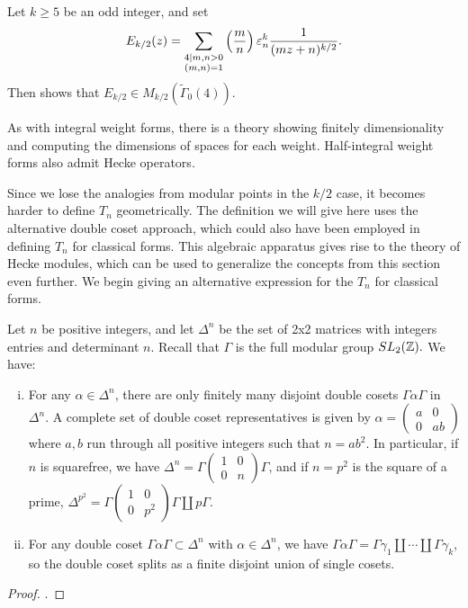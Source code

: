 \documentclass[12pt, a4paper]{report}
\begin{document}
\begin{example}
  Let $k \geq 5$ be an odd integer, and set
   \[E_{k/2}(z) = \sum_{\substack{4 \mid m,n > 0 \\ (m,n) = 1}} \left(\frac{m}{n}\right) 
    \varepsilon_n^k \frac{1}{(mz + n)^{k/2}}.\]
  Then \cite[Page 186]{koblitz} shows that $E_{k/2} \in M_{k/2}(\tilde{\Gamma}_0(4)).$
\end{example}

As with integral weight forms, there is a theory showing finitely dimensionality
and computing the dimensions of spaces for each weight. Half-integral weight
forms also admit Hecke operators.  

Since we lose the analogies from modular points in the $k/2$ case, it becomes
harder to define $T_n$ geometrically. The definition we will give here uses the
alternative double coset approach, which could also have been employed in
defining $T_n$ for classical forms. This algebraic apparatus gives
rise to the theory of Hecke modules, which can be used to generalize
the concepts from this section even further. We begin giving an alternative
expression for the $T_n$ for classical forms.

\begin{prop} \label{hecke_alt}
  Let $n$ be positive integers, and let $\Delta^n$ be the set of 2x2 matrices
  with integers entries and determinant $n$. Recall that $\Gamma$ is the full
  modular group $SL_2({\mathbb Z}).$ We have:
  \begin{enumerate}[(i)]
  \item For any $\alpha \in \Delta^n$, there are only finitely many disjoint
    double cosets $\Gamma \alpha \Gamma$ in $\Delta^n.$ A complete set of double
    coset representatives is given by $\alpha = \left(
      \begin{smallmatrix}
        a & 0 \\ 0 & a b
      \end{smallmatrix}
    \right)$  where $a, b$ run through all positive integers such that $n =
    a b^2.$
    In particular, if $n$ is squarefree, we have $\Delta^n = \Gamma \left(
      \begin{smallmatrix}
        1 & 0 \\ 0 & n
      \end{smallmatrix}
    \right) \Gamma$, and if $n = p^2$ is the square of a prime, $\Delta^{p^2} = \Gamma \left(
      \begin{smallmatrix}
        1 & 0 \\ 0 & p^2
      \end{smallmatrix}
    \right) \Gamma \amalg p \Gamma$.
  \item For any double coset $\Gamma \alpha \Gamma \subset \Delta^n$ with
    $\alpha \in \Delta^n$, we have $\Gamma \alpha \Gamma = \Gamma \gamma_1
    \amalg \cdots \amalg \Gamma \gamma_k$, so the double coset splits as a
    finite disjoint union of single cosets.
  \end{enumerate}
\end{prop}
\begin{proof}
  \cite[See][Chapter IV-3, Pags 202-203]{koblitz}.
\end{proof}
\end{document}
